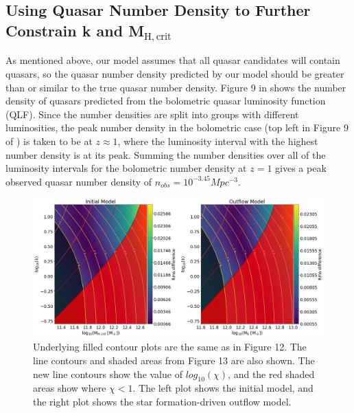 \documentclass[12pt]{article}%
\begin{document}
\subsection{Using Quasar Number Density to Further Constrain k and M$_{\mathrm{H,crit}}$}

As mentioned above, our model assumes that all quasar candidates will contain quasars, so the quasar number density predicted by our model should be greater than or similar to the true quasar number density. Figure 9 in \cite{Hopkins} shows the number density of quasars predicted from the bolometric quasar luminosity function (QLF). Since the number densities are split into groups with different luminosities, the peak number density in the bolometric case (top left in Figure 9 of \citeauthor{Hopkins}) is taken to be at $z\approx1$, where the luminosity interval with the highest number density is at its peak. Summing the number densities over all of the luminosity intervals for the bolometric number density at $z=1$ gives a peak observed quasar number density of $n_{obs}=10^{-3.45}Mpc^{-3}$.

\onecolumngrid


\begin{figure}[H]
\centering
\includegraphics[width=\linewidth]{Plot_11_4.jpeg}
\caption{Underlying filled contour plots are the same as in Figure 12. The line contours and shaded areas from Figure 13 are also shown. The new line contours show the value of $log_{10}(\chi)$, and the red shaded areas show where $\chi<1$. The left plot shows the initial model, and the right plot shows the star formation-driven outflow model.}
\label{fig:14}
\end{figure}

\twocolumngrid
\end{document}
